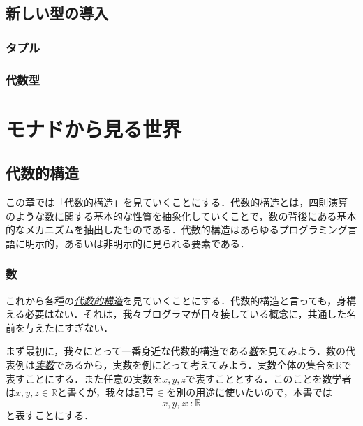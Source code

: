 \documentclass[a5paper,draft]{jsbook}
\newenvironment{leader}{\begingroup}{\endgroup}
\newcommand{\keyword}[1]{{\underline{\emph{#1}}}}
\newcommand{\mathSpecialSet}[1]{\mathbb{#1}} %
\newcommand{\mathIn}{\mathrel{::}}
\begin{document}
\chapter{新しい型の導入}

\section{タプル}

\section{代数型}



\part{モナドから見る世界}

\chapter{代数的構造}

\begin{leader}
この章では「代数的構造」を見ていくことにする．代数的構造とは，四則演算のような数に関する基本的な性質を抽象化していくことで，数の背後にある基本的なメカニズムを抽出したものである．代数的構造はあらゆるプログラミング言語に明示的，あるいは非明示的に見られる要素である．
\end{leader}

\section{数}

これから各種の\keyword{代数的構造}を見ていくことにする．代数的構造と言っても，身構える必要はない．それは，我々プログラマが日々接している概念に，共通した名前を与えたにすぎない．

まず最初に，我々にとって一番身近な代数的構造である\keyword{数}を見てみよう．数の代表例は\keyword{実数}であるから，実数を例にとって考えてみよう．実数全体の集合を$\mathSpecialSet{R}$で表すことにする．また任意の実数を$x,y,z$で表すこととする．このことを数学者は$x,y,z\in\mathSpecialSet{R}$と書くが，我々は記号$\in$を別の用途に使いたいので，本書では
\begin{equation}
x,y,z\mathIn\mathSpecialSet{R}
\end{equation}
と表すことにする．
\end{document}
